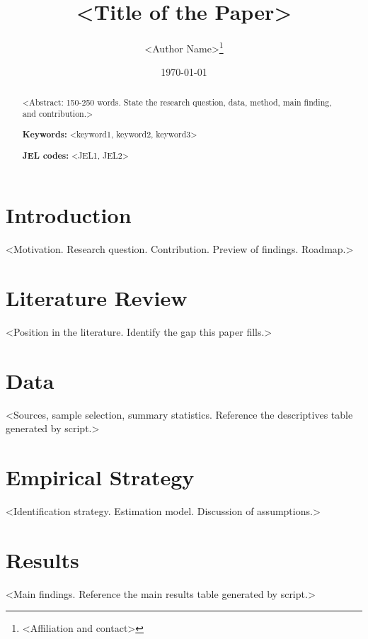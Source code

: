 \documentclass[12pt,a4paper]{article}
\title{<Title of the Paper>}
\author{<Author Name>\thanks{<Affiliation and contact>}}
\date{\today}
\begin{document}
\maketitle

\begin{abstract}
\noindent <Abstract: 150-250 words. State the research question, data, method,
main finding, and contribution.>

\noindent\textbf{Keywords:} <keyword1, keyword2, keyword3>

\noindent\textbf{JEL codes:} <JEL1, JEL2>  %
\end{abstract}

\section{Introduction}
\label{sec:intro}

<Motivation. Research question. Contribution. Preview of findings. Roadmap.>

\section{Literature Review}
\label{sec:lit}

<Position in the literature. Identify the gap this paper fills.>

\section{Data}
\label{sec:data}

<Sources, sample selection, summary statistics. Reference the descriptives
table generated by script.>



\section{Empirical Strategy}
\label{sec:methods}

<Identification strategy. Estimation model. Discussion of assumptions.>

\section{Results}
\label{sec:results}

<Main findings. Reference the main results table generated by script.>


\end{document}
